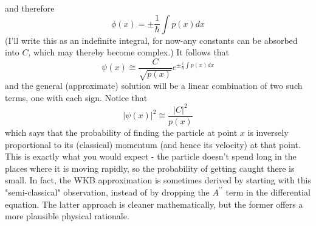 \documentclass[main.tex]{subfiles}
\begin{document}
and therefore
$$
\phi(x)=\pm \frac{1}{\hbar} \int p(x) d x
$$
(I'll write this as an indefinite integral, for now-any constants can be absorbed into $C$, which may thereby become complex.) It follows that
$$
\psi(x) \cong \frac{C}{\sqrt{p(x)}} e^{\pm \frac{i}{\hbar} \int p(x) d x}
$$
and the general (approximate) solution will be a linear combination of two such terms, one with each sign.
Notice that
$$
|\psi(x)|^2 \cong \frac{|C|^2}{p(x)}
$$
which says that the probability of finding the particle at point $x$ is inversely proportional to its (classical) momentum (and hence its velocity) at that point. This is exactly what you would expect - the particle doesn't spend long in the places where it is moving rapidly, so the probability of getting caught there is small. In fact, the WKB approximation is sometimes derived by starting with this "semi-classical" observation, instead of by dropping the $A^{\prime \prime}$ term in the differential equation. The latter approach is cleaner mathematically, but the former offers a more plausible physical rationale.

\begin{example}

\end{example}
\end{document}
